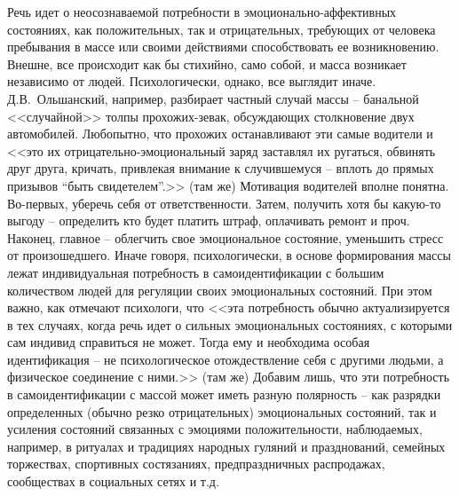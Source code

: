 Речь идет о неосознаваемой потребности в эмоционально-аффективных состояниях, как положительных,
так и отрицательных, требующих от человека пребывания в массе или своими действиями способствовать ее возникновению.
Внешне, все происходит как бы стихийно, само собой, и масса возникает независимо от людей. Психологически, однако,
все выглядит иначе. Д.В.~Ольшанский, например, разбирает частный случай массы -- банальной <<случайной>> толпы
прохожих-зевак, обсуждающих столкновение двух автомобилей. Любопытно, что прохожих останавливают эти самые водители и
<<это их отрицательно-эмоциональный заряд заставлял их ругаться, обвинять друг друга, кричать, привлекая внимание к
случившемуся -- вплоть до прямых призывов ``быть свидетелем''.>> (там же) Мотивация водителей вполне понятна.
Во-первых, уберечь себя от ответственности. Затем, получить хотя бы какую-то выгоду -- определить кто будет платить
штраф, оплачивать ремонт и проч. Наконец, главное -- облегчить свое эмоциональное состояние, уменьшить стресс от
произошедшего. Иначе говоря, психологически, в основе формирования массы лежат индивидуальная потребность в
самоидентификации с большим количеством людей для регуляции своих эмоциональных состояний. При этом важно, как
отмечают психологи, что <<эта потребность обычно актуализируется в тех случаях, когда речь идет о сильных
эмоциональных состояниях, с которыми сам индивид справиться не может. Тогда ему и необходима особая идентификация --
не психологическое отождествление себя с другими людьми, а физическое соединение с ними.>> (там же) Добавим лишь,
что эти потребность в самоидентификации с массой может иметь разную полярность -- как разрядки определенных
(обычно резко отрицательных) эмоциональных состояний, так и усиления состояний связанных с эмоциями положительности,
наблюдаемых, например, в ритуалах и традициях народных гуляний и празднований, семейных торжествах, спортивных
состязаниях, предпраздничных распродажах, сообществах в социальных сетях и т.д.

